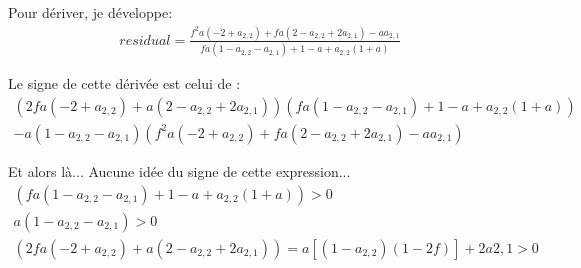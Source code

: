 \documentclass[11pt,a4paper]{article}
\begin{document}
Pour dériver, je développe: 
\begin{gather*}
residual=\frac{f^2a\left(-2+a_{2,2}\right)+fa\left(2-a_{2,2}+2a_{2,1}\right)-aa_{2,1}}{fa\left(1-a_{2,2}-a_{2,1}\right)+1-a+a_{2,2}(1+a)}
\end{gather*}

Le signe de cette dérivée est celui de : 
\begin{gather*}
\left(
	2fa\left(
		-2+a_{2,2}\right)
	+a\left(
		2-a_{2,2}+2a_{2,1}\right)
	\right)
\left(
	fa\left(
		1-a_{2,2}-a_{2,1}\right)
+1-a+a_{2,2}(1+a)\right) \\
-a\left(
	1-a_{2,2}-a_{2,1}\right)
\left(
	f^2a\left(
		-2+a_{2,2}\right)
	+fa\left(
		2-a_{2,2}+2a_{2,1}\right)
	-aa_{2,1}\right)
\end{gather*}

Et alors là... Aucune idée du signe de cette expression...
\begin{gather*}
\left(
	fa\left(
		1-a_{2,2}-a_{2,1}\right)
+1-a+a_{2,2}(1+a)\right) > 0
\\
a\left(
	1-a_{2,2}-a_{2,1}\right) >0
\\
\left(
	2fa\left(
		-2+a_{2,2}\right)
	+a\left(
		2-a_{2,2}+2a_{2,1}\right)
	\right) = a\left[\left(1-a_{2,2}\right)\left(1-2f\right)\right]+2a{2,1}	>0
\end{gather*}
\end{document}
